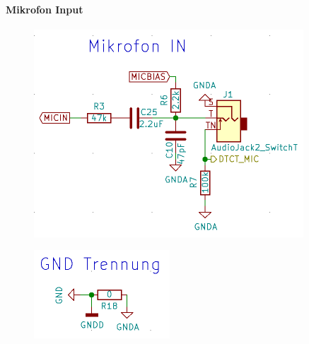 \paragraph{Mikrofon Input}
\label{par:MicIN}

\begin{figure} [H]
\begin{center}
\includegraphics[scale=0.5]{../graphics/Schema_MicIN.png}
\caption{}
\label{fig:Schema_MicIN}
\end{center}
\end{figure}

\begin{figure} [H]
\begin{center}
 \includegraphics[scale=0.5]{../graphics/Schema_GND.png} 
\caption{}
\label{fig:Schema_GND}
\end{center}
\end{figure}



 